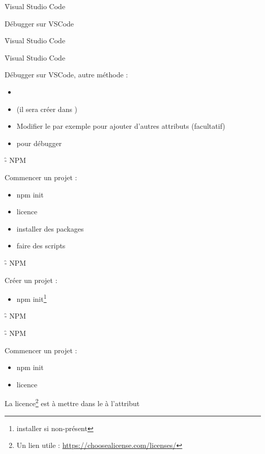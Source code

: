 \documentclass[12pt,aspectratio=169]{beamer}
\begin{document}
\f{Visual Studio Code}{
\begin{center}
    Débugger sur VSCode
\end{center}
}



\f{Visual Studio Code}{
\centering
{}
}

\f{Visual Studio Code}{
\begin{center}
    Débugger sur VSCode, autre méthode :
    \begin{itemize}
        \item {}
        \item {} (il sera créer dans )
        \item Modifier le  par exemple pour ajouter d'autres attributs (facultatif)
        \item {} pour débugger
    \end{itemize}
\end{center}
}



\f{\js - NPM}{
Commencer un projet :
\begin{itemize}
    \item npm init
    \item licence
    \item installer des packages
    \item faire des scripts
\end{itemize}
}

\f{\js - NPM}{
Créer un projet :
\begin{itemize}
    \item npm init\footnote{installer  si non-présent}
\end{itemize}

}

\f{\js - NPM}{
\small
{}
}

\f{\js - NPM}{
Commencer un projet :
\begin{itemize}
    \item npm init \checkmark
    \item licence
\end{itemize}
\begin{center}
La licence\footnote{Un lien utile : \url{https://choosealicense.com/licenses/}} est à mettre dans le  à l'attribut 
\end{center}
}
\end{document}
